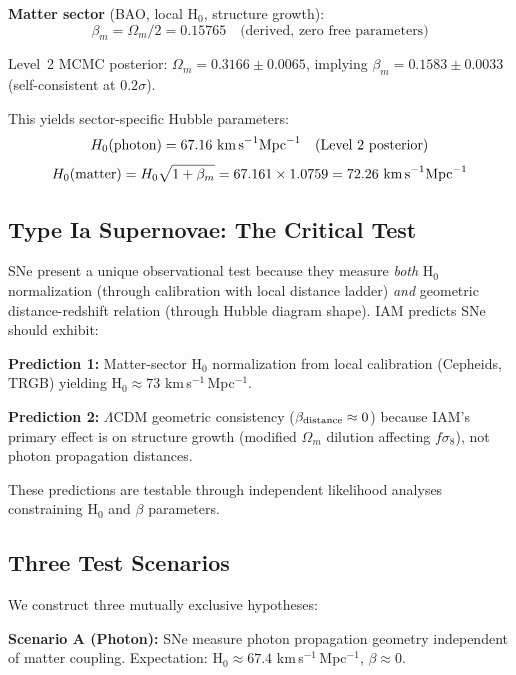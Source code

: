 \documentclass[twocolumn,superscriptaddress,prd,amsmath,amssymb]{revtex4-2}
\begin{document}
\textbf{Matter sector} (BAO, local H$_0$, structure growth):
\begin{equation}
\beta_m = \Omega_m/2 = 0.15765 \quad \text{(derived, zero free parameters)}
\end{equation}

Level~2 MCMC posterior: $\Omega_m = 0.3166 \pm 0.0065$, implying $\beta_m = 0.1583 \pm 0.0033$ (self-consistent at $0.2\sigma$).

This yields sector-specific Hubble parameters:
\begin{equation}
H_0(\text{photon}) = 67.16 \text{ km\,s}^{-1}\text{Mpc}^{-1} \quad \text{(Level~2 posterior)}
\end{equation}
\begin{equation}
H_0(\text{matter}) = H_0\sqrt{1+\beta_m} = 67.161 \times 1.0759 = 72.26 \text{ km\,s}^{-1}\text{Mpc}^{-1}
\end{equation}

\subsection{Type Ia Supernovae: The Critical Test}

SNe present a unique observational test because they measure \textit{both} H$_0$ normalization (through calibration with local distance ladder) \textit{and} geometric distance-redshift relation (through Hubble diagram shape). IAM predicts SNe should exhibit:

\textbf{Prediction 1:} Matter-sector H$_0$ normalization from local calibration (Cepheids, TRGB) yielding H$_0 \approx 73$ km\,s$^{-1}$\,Mpc$^{-1}$.

\textbf{Prediction 2:} $\Lambda$CDM geometric consistency ($\beta_{\rm distance} \approx 0$) because IAM's primary effect is on structure growth (modified $\Omega_m$ dilution affecting $f\sigma_8$), not photon propagation distances.

These predictions are testable through independent likelihood analyses constraining H$_0$ and $\beta$ parameters.

\subsection{Three Test Scenarios}

We construct three mutually exclusive hypotheses:

\textbf{Scenario A (Photon):} SNe measure photon propagation geometry independent of matter coupling. Expectation: H$_0 \approx 67.4$ km\,s$^{-1}$\,Mpc$^{-1}$, $\beta \approx 0$.
\end{document}
